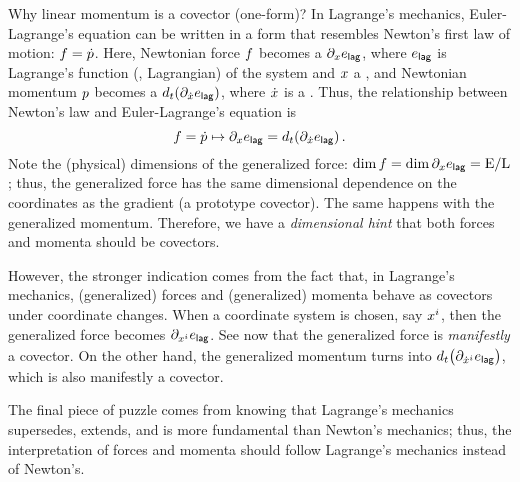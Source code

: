 \begin{note}
  Why linear momentum is a covector (one-form)? In Lagrange's mechanics, Euler-Lagrange's equation can be written in a form that resembles Newton's first law of motion: $\force = \dt\lmom$. Here, Newtonian force $\force$ becomes a  $\ipd\pos\elag$, where $\elag$ is Lagrange's function (\aka, Lagrangian) of the system and $\pos$ a , and Newtonian momentum $\lmom$ becomes a  $d_t\parens{\ipd{\dt\pos}\elag}$, where $\dt\pos$ is a . Thus, the relationship between Newton's law and Euler-Lagrange's equation is
  \begin{equation*}
    \force = \dt\lmom \mapsto \ipd\pos\elag = d_t\parens{\ipd{\dt\pos}\elag}\,.
  \end{equation*}
  Note the (physical) dimensions of the generalized force: $\dim\force = \dim\ipd\pos\elag = \phdim{E/L}$; thus, the generalized force has the same dimensional dependence on the coordinates as the gradient (a prototype covector). The same happens with the generalized momentum. Therefore, we have a \emph{dimensional hint} that both forces and momenta should be covectors. 
  
  However, the stronger indication comes from the fact that, in Lagrange's mechanics, (generalized) forces and (generalized) momenta behave as covectors under coordinate changes. When a coordinate system is chosen, say $\tvec\pos i$, then the generalized force becomes $\ipd{\tvec\pos i}\elag$. See now that the generalized force is \emph{manifestly} a covector. On the other hand, the generalized momentum turns into $d_t\parens{\ipd{\tvec{\dt\pos} i}\elag}$, which is also manifestly a covector.
  
  The final piece of puzzle comes from knowing that Lagrange's mechanics supersedes, extends, and is more fundamental than Newton's mechanics; thus, the interpretation of forces and momenta should follow Lagrange's mechanics instead of Newton's.
\end{note}

